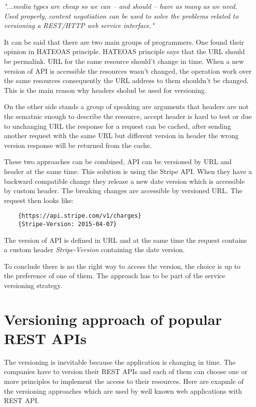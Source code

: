 \emph{"...media types are cheap so we can – and should – have as many as we need. Used properly, content negotiation can be used to solve the problems related to versioning a REST/HTTP web service interface."\cite{website:versioning-rest-web-services}}

\bigskip

It can be said that there are two main groups of programmers. One found their opinion in HATEOAS principle. HATEOAS principle says that the URL should be permalink. URL for the same resource should't change in time. When a new version of API is accessible the resources wasn't changed, the operation work over the same resources consequently the URL address to them shouldn't be changed. This is the main reason why headers sholud be used for versioning. 

On the other side stands a group of speaking are arguments that headers are not the sematnic enough to describe the resource, accept header is hard to test or due to unchanging URL the response for a request can be cached, after sending another request with the same URL but different version in header the wrong version response will be returned from the cache.

\bigskip

These two approaches can be combined, API can be versioned by URL and header at the same time. This solution is using the Stripe API. When they have a backward compatible change they release a new date version which is accessible by custom header. The breaking changes are accessible by versioned URL. The request then looks like: 

\begin{lstlisting}
    {https://api.stripe.com/v1/charges}
    {Stripe-Version: 2015-04-07}
\end{lstlisting}

The version of API is defined in URL and at the same time the request contains a custom header \emph{Stripe-Version} containing the date version.

To conclude there is no the right way to access the version, the choice is up to the preference of one of them. The approach has to be part of the service versioning strategy.

\section{Versioning approach of popular REST APIs}
The versioning is inevitable because the application is changing in time. The companies have to version their REST APIs and each of them can choose one or more principles to implement the access to their resources. 
Here are exapmle of the versioning approaches which are used by well known web applications with REST API. \cite{website:restapi-example}

